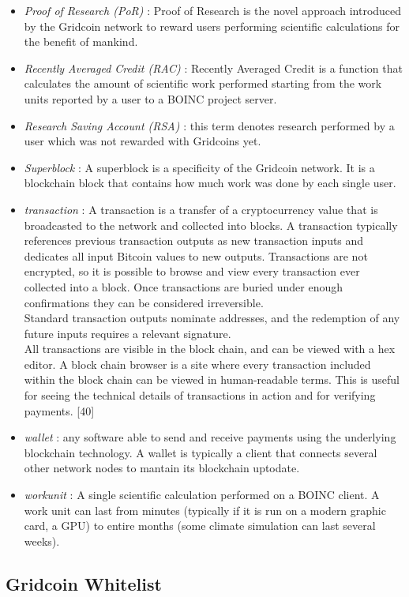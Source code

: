 \begin{itemize}
  \item \textit{Proof of Research (PoR)} : Proof of Research is the novel approach introduced by the Gridcoin network to reward users performing scientific calculations for the benefit of mankind.
  \item \textit{Recently Averaged Credit (RAC)} : Recently Averaged Credit is a function that calculates the amount of scientific work performed starting from the work units reported by a user to a BOINC project server.
  \item \textit{Research Saving Account (RSA)} : this term denotes research performed by a user which was not rewarded with Gridcoins yet.
  \item \textit{Superblock} : A superblock is a specificity of the Gridcoin network. It is a blockchain block that contains how much work was done by each single user.
  \item \textit{transaction} : A transaction is a transfer of a cryptocurrency value that is broadcasted to the network and collected into blocks. A transaction typically references previous transaction outputs as new transaction inputs and dedicates all input Bitcoin values to new outputs. Transactions are not encrypted, so it is possible to browse and view every transaction ever collected into a block. Once transactions are buried under enough confirmations they can be considered irreversible.\\
Standard transaction outputs nominate addresses, and the redemption of any future inputs requires a relevant signature.\\
All transactions are visible in the block chain, and can be viewed with a hex editor. A block chain browser is a site where every transaction included within the block chain can be viewed in human-readable terms. This is useful for seeing the technical details of transactions in action and for verifying payments. [40]
  \item \textit{wallet} : any software able to send and receive payments using the underlying blockchain technology. A wallet is typically a client that connects several other network nodes to mantain its blockchain uptodate.
  \item \textit{workunit} : A single scientific calculation performed on a BOINC client. A work unit can last from minutes (typically if it is run on a modern graphic card, a GPU) 
to entire months (some climate simulation can last several weeks).
\end{itemize}

\subsection{Gridcoin Whitelist}


